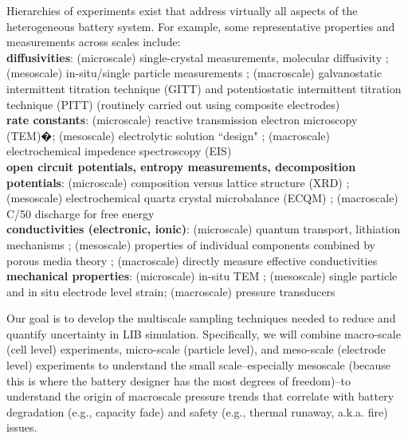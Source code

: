 \documentclass[11pt]{article}
\begin{document}
Hierarchies of experiments exist that address virtually all aspects 
of the heterogeneous battery system.  For example, some representative properties and measurements across scales include:\\
\textbf{diffusivities}: (microscale) single-crystal measurements, molecular diffusivity  \cite{Chung:2011}; (mesoscale) in-situ/single particle measurements \cite{Cui:2012};  (macroscale) galvanostatic intermittent titration technique (GITT) and potentiostatic intermittent titration technique (PITT) (routinely carried out using composite electrodes) \cite{Wen01121979}\\
\textbf{rate constants}: (microscale) reactive transmission electron microscopy (TEM)�\cite{Gu2012}; (mesoscale) electrolytic
solution ``design" \cite{Aurbach2004};  
(macroscale) electrochemical impedence spectroscopy (EIS) \cite{Meyers2000} \\
\textbf{open circuit potentials, entropy measurements, decomposition potentials}:  
(microscale) composition versus lattice structure (XRD) \cite{Ceder2009,Ohzuku1995};
(mesoscale) electrochemical quartz crystal microbalance (ECQM) \cite{Buttry1992};
(macroscale) C/50 discharge for free energy\\
\textbf{conductivities (electronic, ionic)}:  
(microscale) quantum transport, lithiation mechanisms \cite{Ceder2009};
(mesoscale) properties of individual components combined by porous media theory \cite{Stroud1975};
(macroscale) directly measure effective conductivities \\
\textbf{mechanical properties}: 
(microscale) in-situ TEM \cite{Wang:2012};
(mesoscale) single particle and in situ electrode level strain\cite{Qi:2010,Verbrugge:1999};
(macroscale) pressure transducers 

Our goal is to develop the multiscale sampling techniques
needed to reduce and quantify uncertainty in LIB simulation.
Specifically, we will combine
macro-scale (cell level) experiments,
micro-scale (particle level), and meso-scale (electrode level) experiments to
understand the small scale--especially mesoscale (because this is where the
battery designer has the most degrees of freedom)--to 
understand the
origin of macroscale
pressure trends that correlate with battery degradation (e.g.,
capacity fade) and safety (e.g., thermal runaway, a.k.a. fire) issues.
\end{document}

